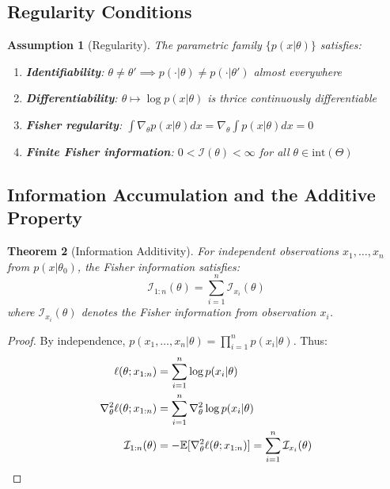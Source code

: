 \documentclass[11pt]{article}
\newtheorem{theorem}{Theorem}
\newtheorem{assumption}[theorem]{Assumption}
\begin{document}
\subsection{Regularity Conditions}

\begin{assumption}[Regularity]
\label{ass:regularity}
The parametric family $\{p(x|\theta)\}$ satisfies:
\begin{enumerate}
\item \textbf{Identifiability}: $\theta \neq \theta' \implies p(\cdot|\theta) \neq p(\cdot|\theta')$ almost everywhere
\item \textbf{Differentiability}: $\theta \mapsto \log p(x|\theta)$ is thrice continuously differentiable
\item \textbf{Fisher regularity}: $\int \nabla_\theta p(x|\theta) dx = \nabla_\theta \int p(x|\theta) dx = 0$
\item \textbf{Finite Fisher information}: $0 < \mathcal{I}(\theta) < \infty$ for all $\theta \in \text{int}(\Theta)$
\end{enumerate}
\end{assumption}

\subsection{Information Accumulation and the Additive Property}

\begin{theorem}[Information Additivity]
\label{thm:info_add}
For independent observations $x_1, \ldots, x_n$ from $p(x|\theta_0)$, the Fisher information satisfies:
\begin{equation}
\mathcal{I}_{1:n}(\theta) = \sum_{i=1}^n \mathcal{I}_{x_i}(\theta)
\end{equation}
where $\mathcal{I}_{x_i}(\theta)$ denotes the Fisher information from observation $x_i$.
\end{theorem}

\begin{proof}
By independence, $p(x_1, \ldots, x_n|\theta) = \prod_{i=1}^n p(x_i|\theta)$. Thus:
\begin{align}
\ell(\theta; x_{1:n}) &= \sum_{i=1}^n \log p(x_i|\theta)\\
\nabla^2_\theta \ell(\theta; x_{1:n}) &= \sum_{i=1}^n \nabla^2_\theta \log p(x_i|\theta)\\
\mathcal{I}_{1:n}(\theta) &= -\mathbb{E}[\nabla^2_\theta \ell(\theta; x_{1:n})] = \sum_{i=1}^n \mathcal{I}_{x_i}(\theta) \qedhere
\end{align}
\end{proof}
\end{document}
